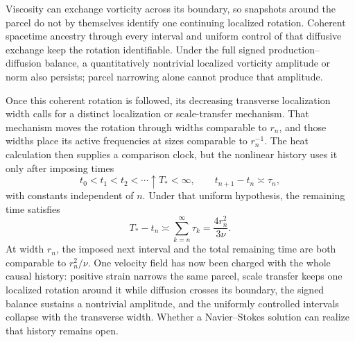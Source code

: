 Viscosity can exchange vorticity across its boundary, so snapshots around the parcel do not by themselves identify one continuing localized rotation. Coherent spacetime ancestry through every interval and uniform control of that diffusive exchange keep the rotation identifiable. Under the full signed production--diffusion balance, a quantitatively nontrivial localized vorticity amplitude or norm also persists; parcel narrowing alone cannot produce that amplitude.

Once this coherent rotation is followed, its decreasing transverse localization width calls for a distinct localization or scale-transfer mechanism. That mechanism moves the rotation through widths comparable to \(r_n\), and those widths place its active frequencies at sizes comparable to \(r_n^{-1}\). The heat calculation then supplies a comparison clock, but the nonlinear history uses it only after imposing times
\[
  t_0<t_1<t_2<\cdots\uparrow T_*<\infty,
  \qquad
  t_{n+1}-t_n\asymp\tau_n,
\]
with constants independent of \(n\). Under that uniform hypothesis, the remaining time satisfies
\[
  T_*-t_n
  \asymp
  \sum_{k=n}^{\infty}\tau_k
  =
  \frac{4r_n^2}{3\nu}.
\]
At width \(r_n\), the imposed next interval and the total remaining time are both comparable to \(r_n^2/\nu\). One velocity field has now been charged with the whole causal history: positive strain narrows the same parcel, scale transfer keeps one localized rotation around it while diffusion crosses its boundary, the signed balance sustains a nontrivial amplitude, and the uniformly controlled intervals collapse with the transverse width. Whether a Navier--Stokes solution can realize that history remains open.
